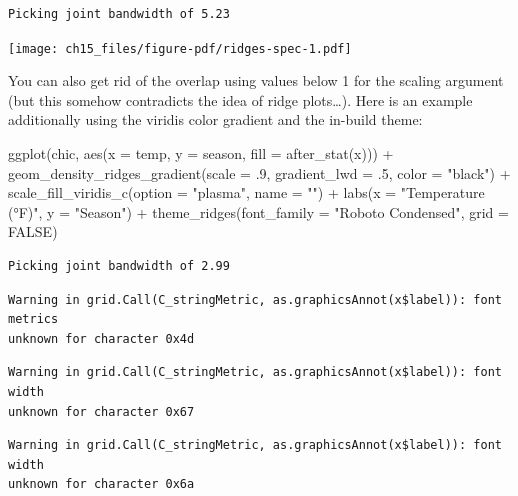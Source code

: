 \documentclass[
  letterpaper,
]{scrbook}
\newenvironment{Shaded}{\begin{snugshade}}{\end{snugshade}}
\newcommand{\AttributeTok}[1]{\textcolor[rgb]{0.40,0.45,0.13}{#1}}
\newcommand{\ConstantTok}[1]{\textcolor[rgb]{0.56,0.35,0.01}{#1}}
\newcommand{\DecValTok}[1]{\textcolor[rgb]{0.68,0.00,0.00}{#1}}
\newcommand{\FunctionTok}[1]{\textcolor[rgb]{0.28,0.35,0.67}{#1}}
\newcommand{\NormalTok}[1]{\textcolor[rgb]{0.00,0.23,0.31}{#1}}
\newcommand{\SpecialCharTok}[1]{\textcolor[rgb]{0.37,0.37,0.37}{#1}}
\newcommand{\StringTok}[1]{\textcolor[rgb]{0.13,0.47,0.30}{#1}}
\begin{document}
\begin{verbatim}
Picking joint bandwidth of 5.23
\end{verbatim}

\texttt{[image: ch15\_files/figure-pdf/ridges-spec-1.pdf]}

You can also get rid of the overlap using values below 1 for the scaling
argument (but this somehow contradicts the idea of ridge plots\ldots).
Here is an example additionally using the viridis color gradient and the
in-build theme:

\begin{Shaded}
\begin{Highlighting}[]
\FunctionTok{ggplot}\NormalTok{(chic, }\FunctionTok{aes}\NormalTok{(}\AttributeTok{x =}\NormalTok{ temp, }\AttributeTok{y =}\NormalTok{ season, }\AttributeTok{fill =} \FunctionTok{after\_stat}\NormalTok{(x))) }\SpecialCharTok{+}
  \FunctionTok{geom\_density\_ridges\_gradient}\NormalTok{(}\AttributeTok{scale =}\NormalTok{ .}\DecValTok{9}\NormalTok{, }\AttributeTok{gradient\_lwd =}\NormalTok{ .}\DecValTok{5}\NormalTok{,}
                               \AttributeTok{color =} \StringTok{"black"}\NormalTok{) }\SpecialCharTok{+}
  \FunctionTok{scale\_fill\_viridis\_c}\NormalTok{(}\AttributeTok{option =} \StringTok{"plasma"}\NormalTok{, }\AttributeTok{name =} \StringTok{""}\NormalTok{) }\SpecialCharTok{+}
  \FunctionTok{labs}\NormalTok{(}\AttributeTok{x =} \StringTok{"Temperature (°F)"}\NormalTok{, }\AttributeTok{y =} \StringTok{"Season"}\NormalTok{) }\SpecialCharTok{+}
  \FunctionTok{theme\_ridges}\NormalTok{(}\AttributeTok{font\_family =} \StringTok{"Roboto Condensed"}\NormalTok{, }\AttributeTok{grid =} \ConstantTok{FALSE}\NormalTok{)}
\end{Highlighting}
\end{Shaded}

\begin{verbatim}
Picking joint bandwidth of 2.99
\end{verbatim}

\begin{verbatim}
Warning in grid.Call(C_stringMetric, as.graphicsAnnot(x$label)): font metrics
unknown for character 0x4d
\end{verbatim}

\begin{verbatim}
Warning in grid.Call(C_stringMetric, as.graphicsAnnot(x$label)): font width
unknown for character 0x67
\end{verbatim}

\begin{verbatim}
Warning in grid.Call(C_stringMetric, as.graphicsAnnot(x$label)): font width
unknown for character 0x6a
\end{verbatim}
\end{document}
